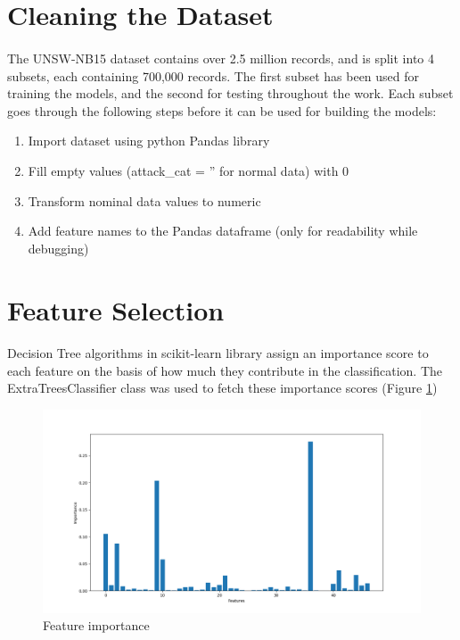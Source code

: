 \section{Cleaning the Dataset}
\paragraph{}
The UNSW-NB15 dataset contains over 2.5 million records, and is split into 4 subsets, each containing 700,000 records. The first subset has been used for training the models, and the second for testing throughout the work. Each subset goes through the following steps before it can be used for building the models:
\begin{enumerate}
    \item Import dataset using python Pandas library
    \item Fill empty values (attack\_cat = '' for normal data) with 0
    \item Transform nominal data values to numeric
    \item Add feature names to the Pandas dataframe (only for readability while debugging)
\end{enumerate}

\section{Feature Selection}
\label{feature_select}
\paragraph{}
Decision Tree algorithms in scikit-learn library assign an importance score to each feature on the basis of how much they contribute in the classification. The ExtraTreesClassifier class was used to fetch these importance scores (Figure \ref{feature_importance})
\begin{figure}[h]
    \hfill\includegraphics[width=1\textwidth]{Chapter3/feature_importance}\hspace*{\fill}
    \caption{Feature importance}
    \label{feature_importance}
\end{figure}

